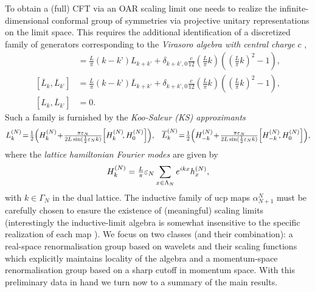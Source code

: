 \documentclass[a4paper, 11pt]{article}
\DeclareMathOperator{\1}{\mathds{1}}
\begin{document}
To obtain a (full) CFT via an OAR scaling limit one needs to realize the infinite-dimensional conformal group of symmetries via projective unitary representations on the limit space. This requires the additional identification of a discretized family of generators corresponding to the \emph{Virasoro algebra with central charge} $c$ \cite{DiFrancescoCFTBook},
\begin{align*}
[L_{k}, L_{k’}] & = \tfrac{L}{\pi}(k-k’)L_{k+k’} + \delta_{k+k’,0}\tfrac{c}{12}(\tfrac{L}{\pi}k)((\tfrac{L}{\pi}k)^2-1), \\ \nonumber 
[\overline{L}_{k}, \overline{L}_{k’}] & = \tfrac{L}{\pi}(k-k’)\overline{L}_{k+k’} + \delta_{k+k’,0}\tfrac{c}{12}(\tfrac{L}{\pi}k)((\tfrac{L}{\pi}k)^2-1), \\ \nonumber
[L_{k}, \overline{L}_{k’}] & = 0.
\end{align*}
Such a family is furnished by the \emph{Koo-Saleur (KS) approximants} \cite{KooRepresentationsOfThe} 
\begin{align*}
L_{k}^{(N)} &\!=\!\tfrac{1}{2}\Big(H_{k}^{(N)}\!+\!\tfrac{\pi\vep_{N}}{2L\sin(\frac{1}{2}\vep_{N}k)}\Big[H_{k}^{(N)}\!,H_0^{(N)}\Big]\Big), & \overline{L}_{k}^{(N)} \!=\!\tfrac{1}{2}\Big(H_{-k}^{(N)}\!+\!\tfrac{\pi\vep_{N}}{2L\sin(\frac{1}{2}\vep_{N}k)}\Big[H_{-k}^{(N)}\!,H_0^{(N)}\Big]\Big),
\end{align*}
where the \emph{lattice hamiltonian Fourier modes} are given by
\begin{align*}
H_k^{(N)} = \tfrac{L}{\pi}\varepsilon_{N}\sum_{x\in \Lambda_{N}} e^{ikx} h^{(N)}_x,
\end{align*}
with $k\in\Gamma_{N}$ in the dual lattice. The inductive family of ucp maps $\alpha_{N+1}^N$ must be carefully chosen to ensure the existence of (meaningful) scaling limits (interestingly the inductive-limit algebra is somewhat insensitive to the specific realization of each map \cite{BlackadarGeneralizedInductiveLimits1}). We focus on two classes (and their combination): a real-space renormalisation group based on wavelets and their scaling functions \cite{DaubechiesTenLecturesOn} which explicitly maintains locality of the algebra and a momentum-space renormalisation group based on a sharp cutoff in momentum space. With this preliminary data in hand we turn now to a summary of the main results. 
\end{document}

